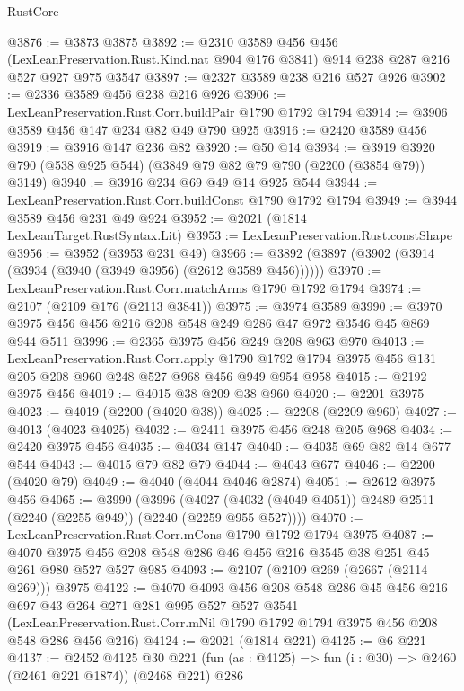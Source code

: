 \begin{lexlean}{RustCore}
\begin{coremodule}
@3876 := @3873 @3875
@3892 := @2310
    @3589
    @456
    @456
    (LexLeanPreservation.Rust.Kind.nat @904 @176 @3841)
    @914
    @238
    @287
    @216
    @527
    @927
    @975
    @3547
@3897 := @2327 @3589 @238 @216 @527 @926
@3902 := @2336 @3589 @456 @238 @216 @926
@3906 := LexLeanPreservation.Rust.Corr.buildPair @1790 @1792 @1794
@3914 := @3906 @3589 @456 @147 @234 @82 @49 @790 @925
@3916 := @2420 @3589 @456
@3919 := @3916 @147 @236 @82
@3920 := @50 @14
@3934 := @3919 @3920 @790 (@538 @925 @544) (@3849 @79 @82 @79 @790 (@2200 (@3854 @79)) @3149)
@3940 := @3916 @234 @69 @49 @14 @925 @544
@3944 := LexLeanPreservation.Rust.Corr.buildConst @1790 @1792 @1794
@3949 := @3944 @3589 @456 @231 @49 @924
@3952 := @2021 (@1814 LexLeanTarget.RustSyntax.Lit)
@3953 := LexLeanPreservation.Rust.constShape
@3956 := @3952 (@3953 @231 @49)
@3966 := @3892 (@3897 (@3902 (@3914 (@3934 (@3940 (@3949 @3956) (@2612 @3589 @456))))))
@3970 := LexLeanPreservation.Rust.Corr.matchArms @1790 @1792 @1794
@3974 := @2107 (@2109 @176 (@2113 @3841))
@3975 := @3974 @3589
@3990 := @3970 @3975 @456 @456 @216 @208 @548 @249 @286 @47 @972 @3546 @45 @869 @944 @511
@3996 := @2365 @3975 @456 @249 @208 @963 @970
@4013 := LexLeanPreservation.Rust.Corr.apply
    @1790
    @1792
    @1794
    @3975
    @456
    @131
    @205
    @208
    @960
    @248
    @527
    @968
    @456
    @949
    @954
    @958
@4015 := @2192 @3975 @456
@4019 := @4015 @38 @209 @38 @960
@4020 := @2201 @3975
@4023 := @4019 (@2200 (@4020 @38))
@4025 := @2208 (@2209 @960)
@4027 := @4013 (@4023 @4025)
@4032 := @2411 @3975 @456 @248 @205 @968
@4034 := @2420 @3975 @456
@4035 := @4034 @147
@4040 := @4035 @69 @82 @14 @677 @544
@4043 := @4015 @79 @82 @79
@4044 := @4043 @677
@4046 := @2200 (@4020 @79)
@4049 := @4040 (@4044 @4046 @2874)
@4051 := @2612 @3975 @456
@4065 := @3990
    (@3996 (@4027 (@4032 (@4049 @4051)) @2489 @2511 (@2240 (@2255 @949)) (@2240 (@2259 @955 @527))))
@4070 := LexLeanPreservation.Rust.Corr.mCons @1790 @1792 @1794 @3975
@4087 := @4070 @3975 @456 @208 @548 @286 @46 @456 @216 @3545 @38 @251 @45 @261 @980 @527 @527 @985
@4093 := @2107 (@2109 @269 (@2667 (@2114 @269))) @3975
@4122 := @4070
    @4093
    @456
    @208
    @548
    @286
    @45
    @456
    @216
    @697
    @43
    @264
    @271
    @281
    @995
    @527
    @527
    @3541
    (LexLeanPreservation.Rust.Corr.mNil @1790 @1792 @1794 @3975 @456 @208 @548 @286 @456 @216)
@4124 := @2021 (@1814 @221)
@4125 := @6 @221
@4137 := @2452
    @4125
    @30
    @221
    (fun (as : @4125) => fun (i : @30) => @2460 (@2461 @221 @1874))
    (@2468 @221)
    @286

\end{coremodule}
\end{lexlean}
